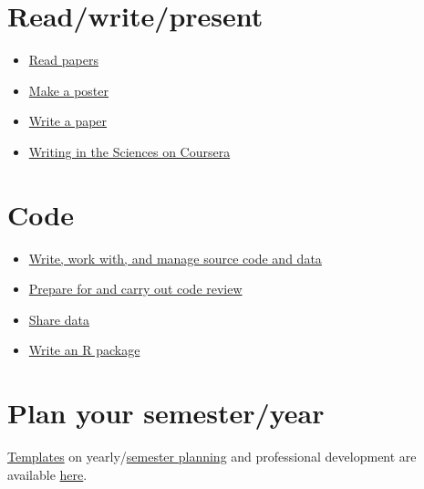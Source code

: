 \documentclass[
  letterpaper,
  DIV=11,
  numbers=noendperiod]{scrreprt}
\providecommand{\tightlist}{%
  \setlength{\itemsep}{0pt}\setlength{\parskip}{0pt}}\usepackage{longtable,booktabs,array}
\begin{document}
\hypertarget{readwritepresent}{%
\section{Read/write/present}\label{readwritepresent}}

\begin{itemize}
\tightlist
\item
  \href{https://github.com/JRaviLab/readingpapers}{Read papers}
\item
  \href{https://github.com/JRaviLab/group/blob/master/docs/howto_make_a_poster.md}{Make
  a poster}
\item
  \href{https://github.com/JRaviLab/group/blob/master/docs/howto_write_a_paper.md}{Write
  a paper}
\item
  \href{https://www.coursera.org/learn/sciwrite}{Writing in the Sciences
  on Coursera}
\end{itemize}

\hypertarget{code}{%
\section{Code}\label{code}}

\begin{itemize}
\tightlist
\item
  \href{https://github.com/JRaviLab/group/blob/master/docs/howto_write_source_code.md}{Write,
  work with, and manage source code and data}
\item
  \href{https://github.com/JRaviLab/group/blob/master/docs/howto_do_code_review.md}{Prepare
  for and carry out code review}
\item
  \href{https://github.com/jtleek/datasharing}{Share data}
\item
  \href{https://github.com/jtleek/rpackages}{Write an R package}
\end{itemize}

\hypertarget{plan-your-semesteryear}{%
\section{Plan your semester/year}\label{plan-your-semesteryear}}

\href{https://github.com/JRaviLab/group/tree/master/docs/templates}{Templates}
on
yearly/\href{https://github.com/JRaviLab/group/blob/master/docs/Yearly-Planning-Document.pdf}{semester
planning} and professional development are available
\href{https://github.com/JRaviLab/group/tree/master/docs}{here}.
\end{document}
